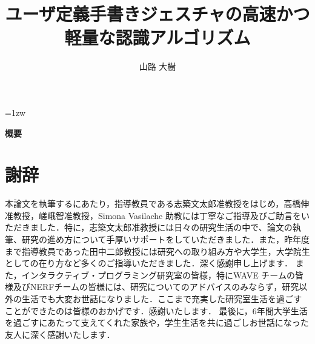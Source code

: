 \documentclass[a4paper,11pt]{jreport}
\title{ユーザ定義手書きジェスチャの高速かつ軽量な認識アルゴリズム}
\author{山路 大樹}
\begin{document}
\maketitle
\thispagestyle{empty}
\newpage

\thispagestyle{empty}
\vspace*{20pt plus 1fil}
\parindent=1zw
\noindent
\begin{center}
{\bf 概要}
\vspace{5mm}
\end{center}



\par
\vspace{0pt plus 1fil}
\newpage

\tableofcontents
\listoffigures

\pagebreak \setcounter{page}{1}





















\chapter*{謝辞}
本論文を執筆するにあたり，指導教員である志築文太郎准教授をはじめ，高橋伸准教授，嵯峨智准教授，Simona Vasilache 助教には丁寧なご指導及びご助言をいただきました．特に，志築文太郎准教授には日々の研究生活の中で、論文の執筆、研究の進め方について手厚いサポートをしていただきました．また，昨年度まで指導教員であった田中二郎教授には研究への取り組み方や大学生，大学院生としての在り方など多くのご指導いただきました．深く感謝申し上げます．
また，インタラクティブ・プログラミング研究室の皆様，特にWAVE チームの皆様及びNERFチームの皆様には、研究についてのアドバイスのみならず，研究以外の生活でも大変お世話になりました．ここまで充実した研究室生活を過ごすことができたのは皆様のおかげです．感謝いたします．
最後に，6年間大学生活を過ごすにあたって支えてくれた家族や，学生生活を共に過ごしお世話になった友人に深く感謝いたします．

\newpage

\renewcommand{\bibname}{参考文献}




\appendix



\end{document}
